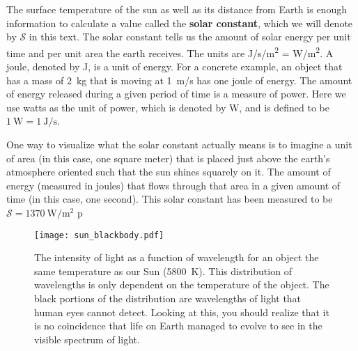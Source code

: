         The surface temperature of the sun as well as its distance from Earth is enough information to calculate a value called the \textbf{solar constant}, which we will denote by $\mathcal{S}$ in this text. The solar constant tells us the amount of solar energy per unit time and per unit area the earth receives. The units are \si{\joule/\second/\meter^{2}} = \si{\watt/\meter^{2}}. A joule, denoted by \si{\joule}, is a unit of energy. For a concrete example, an object that has a mass of \SI{2}{\kg} that is moving at \SI{1}{\m/\s} has one joule of energy. The amount of energy released during a given period of time is a measure of power. Here we use watts as the unit of power, which is denoted by \si{\watt}, and is defined to be $\SI{1}{\watt} = \SI{1}{\joule/\s}$. 

        One way to visualize what the solar constant actually means is to imagine a unit of area (in this case, one square meter) that is placed just above the earth's atmosphere oriented such that the sun shines squarely on it. The amount of energy (measured in joules) that flows through that area in a given amount of time (in this case, one second). This solar constant has been measured to be $\mathcal{S} = \SI{1370}{\watt/\m^2}$ \citep{schroeder1999introduction,thorndike1976energy}p

        \begin{figure}[ht]
            \centering
            \texttt{[image: sun\_blackbody.pdf]}
            \caption{The intensity of light as a function of wavelength for an object the same temperature as our Sun (\SI{5800}{\kelvin}). This distribution of wavelengths is only dependent on the temperature of the object. The black portions of the distribution are wavelengths of light that human eyes cannot detect. Looking at this, you should realize that it is no coincidence that life on Earth managed to evolve to see in the visible spectrum of light.}
            \label{fig:sun_bb}
        \end{figure}

